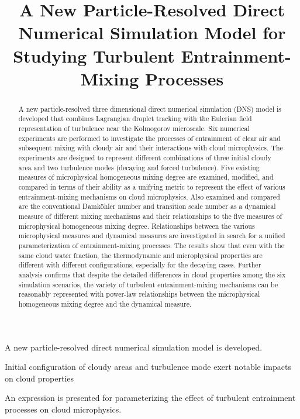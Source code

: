\documentclass[draft,linenumbers]{AGUJournal}
\begin{document}
\title{A New Particle-Resolved Direct Numerical Simulation Model for Studying Turbulent Entrainment-Mixing Processes}



\begin{keypoints}
\item A new particle-resolved direct numerical simulation model is developed.
\item Initial configuration of cloudy areas and turbulence mode exert notable impacts on cloud properties
\item An expression is presented for parameterizing the effect of turbulent entrainment processes on cloud microphysics.
\end{keypoints}

\begin{abstract}
A new particle-resolved three dimensional direct numerical simulation (DNS) model is developed that combines Lagrangian droplet tracking with the Eulerian field representation of turbulence near the Kolmogorov microscale. Six numerical experiments are performed to investigate the processes of entrainment of clear air and subsequent mixing with cloudy air and their interactions with cloud microphysics. The experiments are designed to represent different combinations of three initial cloudy area and two turbulence modes (decaying and forced turbulence). Five existing measures of microphysical homogeneous mixing degree are examined, modified, and compared in terms of their ability as a unifying metric to represent the effect of various entrainment-mixing mechanisms on cloud microphysics. Also examined and compared are the conventional Damk\"ohler number and transition scale number as a dynamical measure of different mixing mechanisms and their relationships to the five measures of microphysical homogeneous mixing degree. Relationships between the various microphysical measures and dynamical measures are investigated in search for a unified parameterization of entrainment-mixing processes. The results show that even with the same cloud water fraction, the thermodynamic and microphysical properties are different with different configurations, especially for the decaying cases. Further analysis confirms that despite the detailed differences in cloud properties among the six simulation scenarios, the variety of turbulent entrainment-mixing mechanisms can be reasonably represented with power-law relationships between the microphysical homogeneous mixing degree and the dynamical measure.    
\end{abstract}
\end{document}
